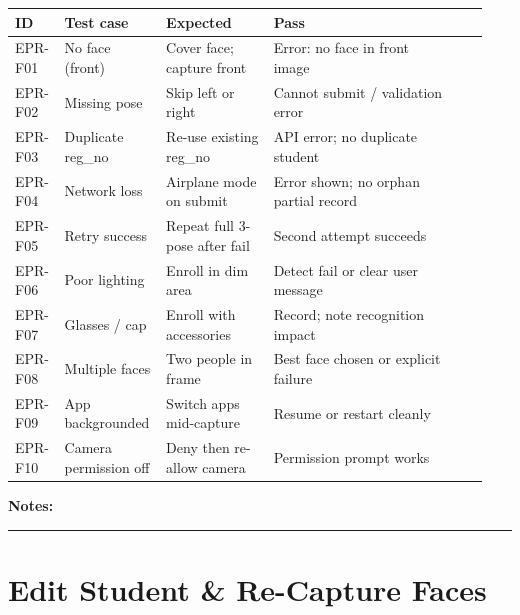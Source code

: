 \documentclass[11pt,a4paper,oneside]{article}
\newcommand{\chk}{\fbox{\rule{0pt}{0.95ex}\rule{0.95ex}{0pt}}}
\newcommand{\fillinlong}{\rule{0.72\textwidth}{0.4pt}}
\newcommand{\notesblock}{\par\smallskip\noindent\textbf{Notes:}\ \fillinlong\par\smallskip}
\newcommand{\tcheadfour}{%
  \toprule
  \textbf{ID} & \textbf{Test case} & \textbf{Expected} & \textbf{Pass} \\
  \midrule
}
\begin{document}
\small
\begin{tabular}{@{}>{\raggedright\arraybackslash}p{0.10\linewidth} >{\raggedright\arraybackslash}p{0.18\linewidth} >{\raggedright\arraybackslash}p{0.22\linewidth} >{\raggedright\arraybackslash}p{0.38\linewidth} >{\centering\arraybackslash}p{0.06\linewidth}@{}}
  \tcheadfour
  EPR-F01 & No face (front)       & Cover face; capture front       & Error: no face in front image        & \chk \\
  EPR-F02 & Missing pose          & Skip left or right              & Cannot submit / validation error     & \chk \\
  EPR-F03 & Duplicate reg\_no     & Re-use existing reg\_no         & API error; no duplicate student      & \chk \\
  EPR-F04 & Network loss          & Airplane mode on submit         & Error shown; no orphan partial record  & \chk \\
  EPR-F05 & Retry success         & Repeat full 3-pose after fail   & Second attempt succeeds              & \chk \\
  EPR-F06 & Poor lighting         & Enroll in dim area              & Detect fail or clear user message    & \chk \\
  EPR-F07 & Glasses / cap         & Enroll with accessories         & Record; note recognition impact      & \chk \\
  EPR-F08 & Multiple faces        & Two people in frame             & Best face chosen or explicit failure & \chk \\
  EPR-F09 & App backgrounded      & Switch apps mid-capture         & Resume or restart cleanly            & \chk \\
  EPR-F10 & Camera permission off & Deny then re-allow camera       & Permission prompt works              & \chk \\
  \bottomrule
\end{tabular}
\normalsize

\notesblock

\section{Edit Student \& Re-Capture Faces}
\end{document}
